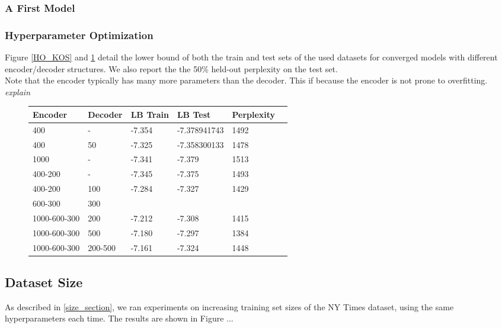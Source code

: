 \documentclass{report}
\begin{document}
	\subsubsection{A First Model}
	
	\subsubsection{Hyperparameter Optimization}\label{ho}
	
	Figure \ref{HO_KOS} and \ref{HO_NY} detail the lower bound of both the train and test sets of the used datasets for converged models with different encoder/decoder structures. We also report the the 50\% held-out perplexity on the test set.\\
	Note that the encoder typically has many more parameters than the decoder. This if because the encoder is not prone to overfitting. \textit{explain} 
	
	\begin{figure}
	\begin{tabular}{l l|l l |l l }\label{HO_NY} 		
		Encoder & Decoder & LB Train & LB Test & Perplexity  	\\
		\hline
		400 & -		& -7.354 & -7.378941743 & 1492 \\

		400 & 50	& -7.325 & -7.358300133 & 1478 \\

		1000 & -	& -7.341 & -7.379 & 1513 \\
	
		400-200 & -	& -7.345 & -7.375 & 1493 \\

		400-200 & 100	& -7.284 & -7.327 & 1429 \\
		
		600-300 & 300	&  &  &  \\

		1000-600-300 & 200	& -7.212 & -7.308 & 1415 \\
		
		1000-600-300 & 500	& -7.180 & \color{red}-7.297 & \color{red}1384 \\
		
		1000-600-300 & 200-500	& \color{red} -7.161 & -7.324 & 1448 \\

	\end{tabular}
\end{figure}	
	\subsection{Dataset Size}
	As described in \ref{size_section}, we ran experiments on increasing training set sizes of the NY Times dataset, using the same hyperparameters each time. The results are shown in Figure ...
\end{document}
